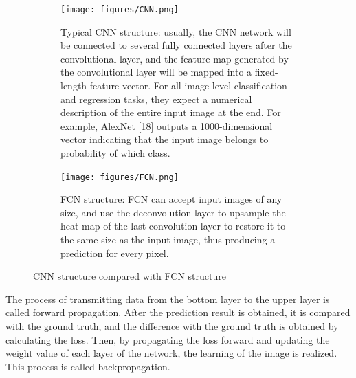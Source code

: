 \begin{figure}[htbp]
    \centering
    \begin{subfigure}[t]{1\linewidth}
        \centering
        \texttt{[image: figures/CNN.png]}
        \caption{Typical CNN structure: usually, the CNN network will be connected to several fully connected layers after the convolutional layer, and the feature map generated by the convolutional layer will be mapped into a fixed-length feature vector. For all image-level classification and regression tasks, they expect a numerical description of the entire input image at the end. For example, AlexNet [18] outputs a 1000-dimensional vector indicating that the input image belongs to probability of which class.}\label{CNN}
    \end{subfigure}
    \begin{subfigure}[t]{1\linewidth}
        \centering
        \texttt{[image: figures/FCN.png]}
        \caption{FCN structure: FCN can accept input images of any size, and use the deconvolution layer to upsample the heat map of the last convolution layer to restore it to the same size as the input image, thus producing a prediction for every pixel.}\label{FCN}
    \end{subfigure}
    \caption{CNN structure compared with FCN structure}\label{FCN-CNN}
\end{figure}


The process of transmitting data from the bottom layer to the upper layer is called forward propagation. After the prediction result is obtained, it is compared with the ground truth, and the difference with the ground truth is obtained by calculating the loss. Then, by propagating the loss forward and updating the weight value of each layer of the network, the learning of the image is realized. This process is called backpropagation.




